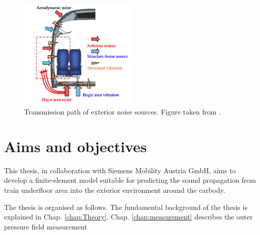 \begin{figure}
    \centering
    \includegraphics[width=0.5\textwidth]{fig/noise_transmission_path.png}
    \caption{Transmission path of exterior noise sources. Figure taken from \cite{zhang_sound_2019}.}
    \label{fig:transmission_path}
\end{figure}

\newpage
\section{Aims and objectives}

This thesis, in collaboration with Siemens Mobility Austria GmbH, aims to develop a finite-element model suitable for predicting the sound propagation from train underfloor area into the exterior environment around the carbody. 


The thesis is organised as follows. The fundamental background of the thesis is explained in Chap. \ref{chap:Theory}. Chap. \ref{chap:measurement} describes the outer pressure field measurement